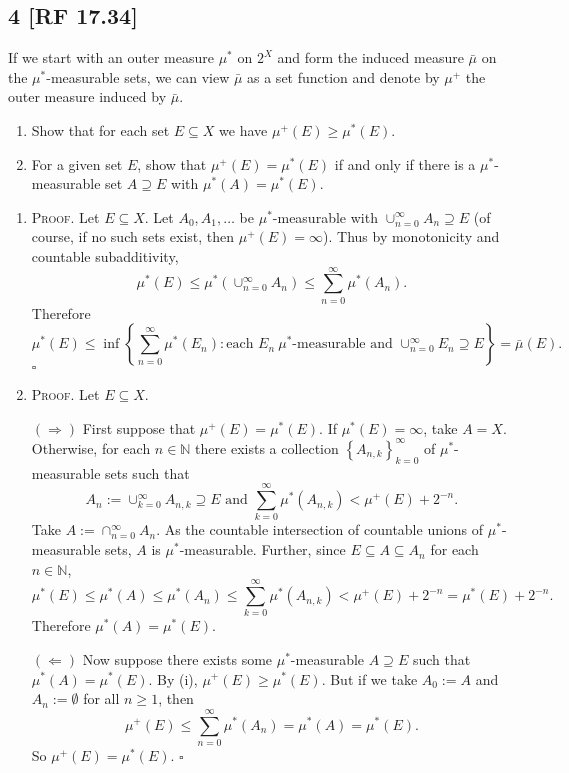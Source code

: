 \documentclass[12pt]{article}
\newcounter{ProofCounter}
\newenvironment{Proof}{\stepcounter{ProofCounter}\textsc{Proof.}}{\hfill$\square$}
\begin{document}
\newpage
\subsection*{4 [RF 17.34]}
\begin{tcolorbox}
If we start with an outer measure $\mu^{*}$ on $2^{X}$ and form the induced measure $\bar{\mu}$ on the $\mu^{*}$-measurable sets, we can view
$\bar{\mu}$ as a set function and denote by $\mu^{+}$ the outer measure induced by $\bar{\mu}$.
\begin{enumerate}[label=(\alph*)]
\item Show that for each set $E \subseteq X$ we have $\mu^{+}(E) \geq \mu^{*}(E)$.
\item For a given set $E$, show that $\mu^{+}(E) = \mu^*(E)$ if and only if there is a $\mu^*$-measurable set $A \supseteq E$ with $\mu^*(A) =
\mu^*(E)$.
\end{enumerate}
\end{tcolorbox}
\begin{enumerate}[label=(\alph*)]
\item \begin{Proof}
Let $E \subseteq X$. Let $A_{0}, A_{1}, \hdots$ be $\mu^*$-measurable with $\cup_{n=0}^{\infty}A_{n}\supseteq E$ (of course, if no such sets exist, then
$\mu^+(E) = \infty$). Thus by monotonicity and countable subadditivity,
\[ \mu^*(E) \leq \mu^*\left( \cup_{n=0}^{\infty}A_{n} \right) \leq \sum_{n=0}^{\infty}\mu^*(A_{n}). \]
Therefore 
\[ \mu^*(E) \leq \inf\left\{ \sum_{n=0}^{\infty}\mu^*(E_{n}) : \text{each }E_{n} \ \mu^{*}\text{-measurable and } \cup_{n=0}^{\infty}E_{n} \supseteq E \right\} =
\bar{\mu}(E). \]
\end{Proof}

\item \begin{Proof}
Let $E \subseteq X$.

$(\Rightarrow)$ First suppose that $\mu^+(E) = \mu^*(E)$. If $\mu^*(E) = \infty$, take $A = X$. Otherwise, for each $n \in \mathbb{N}$ there exists a
collection $\left\{ A_{n,k} \right\}_{k=0}^{\infty}$ of $\mu^*$-measurable sets such that 
\[ A_{n} := \cup_{k=0}^{\infty}A_{n,k} \supseteq E \text{ and } \sum_{k=0}^{\infty}\mu^*(A_{n,k}) < \mu^{+}(E) + 2^{-n}. \]
Take $A := \cap_{n=0}^{\infty}A_{n}$. As the countable intersection of countable unions of
$\mu^*$-measurable sets, $A$ is $\mu^*$-measurable. Further, since $E \subseteq A \subseteq A_{n}$ for each $n \in \mathbb{N}$,
\[ \mu^*(E) \leq \mu^*(A) \leq \mu^*\left( A_{n} \right) \leq \sum_{k=0}^{\infty}\mu^*(A_{n,k}) < \mu^+(E) + 2^{-n} = \mu^*(E) + 2^{-n}. \]
Therefore $\mu^*(A) = \mu^*(E)$.

$(\Leftarrow)$ Now suppose there exists some $\mu^*$-measurable $A \supseteq E$ such that $\mu^*(A) = \mu^*(E)$. By (i), $\mu^+(E) \geq \mu^*(E)$. But
if we take $A_{0} := A$ and $A_{n} := \emptyset$ for all $n \geq 1$, then 
\[ \mu^{+}(E) \leq \sum_{n=0}^{\infty}\mu^{*}(A_{n}) = \mu^*(A) = \mu^*(E). \]
So $\mu^{+}(E) = \mu^{*}(E)$.
\end{Proof}
\end{enumerate}
\end{document}
